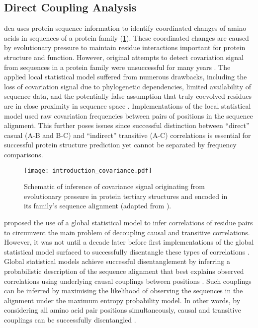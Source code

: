 \subsection{Direct Coupling Analysis}
\Acrlong{dca} uses protein sequence information to identify coordinated changes of amino acids in sequences of a protein family (\cref{fig:introduction_covariance}). These coordinated changes are caused by evolutionary pressure to maintain residue interactions important for protein structure and function. However, original attempts to detect covariation signal from sequences in a protein family were unsuccessful for many years \cite{Taylor1994-es,Gobel1994-rp,Neher1994-qn,Shindyalov1994-yp}. The applied local statistical model suffered from numerous drawbacks, including the loss of covariation signal due to phylogenetic dependencies, limited availability of sequence data, and the potentially false assumption that truly coevolved residues are in close proximity in sequence space \cite{Pollock1997-os,Lapedes1999-cg,Lapedes2012-tu}. Implementations of the local statistical model used raw covariation frequencies between pairs of positions in the sequence alignment. This further poses issues since successful distinction between ``direct'' casual (A-B and B-C) and ``indirect'' transitive (A-C) correlations is essential for successful protein structure prediction yet cannot be separated by frequency comparisons. 

\begin{figure}[H]
    \centering
    \texttt{[image: introduction\_covariance.pdf]}
    \caption[Schematic of inference of covariance signal]{Schematic of inference of covariance signal originating from evolutionary pressure in protein tertiary structures and encoded in its family's sequence alignment (adapted from \cite{Simkovic2017-xs}).}
    \label{fig:introduction_covariance}
\end{figure}

\textcite{Lapedes1999-cg} proposed the use of a global statistical model to infer correlations of residue pairs to circumvent the main problem of decoupling causal and transitive correlations. However, it was not until a decade later before first implementations of the global statistical model surfaced to successfully disentangle these types of correlations \cite{Weigt2009-sx,Burger2010-ee,Balakrishnan2011-wh,Marks2011-os,Morcos2011-lk,Jones2012-ks,Ekeberg2013-ay,Kamisetty2013-le,Seemayer2014-zp}. Global statistical models achieve successful disentanglement by inferring a probabilistic description of the sequence alignment that best explains observed correlations using underlying causal couplings between positions \cite{Hopf2017-pp}. Such couplings can be inferred by maximising the likelihood of observing the sequences in the alignment under the maximum entropy probability model. In other words, by considering all amino acid pair positions simultaneously, causal and transitive couplings can be successfully disentangled \cite{Ekeberg2013-ay}.

